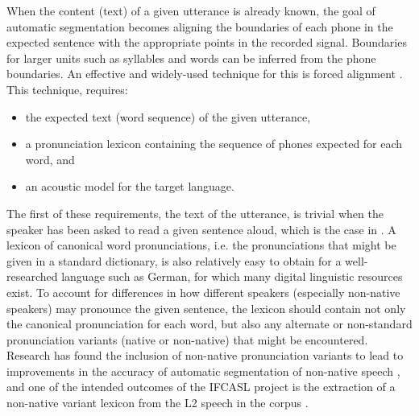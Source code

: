 	
	When the content (text) of a given utterance is already known, the goal of automatic segmentation becomes aligning the  boundaries of each phone in the expected sentence with the appropriate points in the recorded signal. Boundaries for larger units such as syllables and words can be inferred from the phone boundaries. 
	An effective and widely-used technique for this is 
	forced
	alignment \citep{Fohr1996,Mesbahi2011,Fohr2012,Fauth2014}.
	This technique,
	requires:
	\begin{itemize}
	\item the expected text (word sequence) of the given utterance, 
	\item a pronunciation lexicon containing the sequence of phones expected for each word, and
	\item an acoustic model for the target language.
	\end{itemize}
	
	The first of these requirements, the text of the utterance, is trivial when the speaker has been asked to read a given sentence aloud, which is the case in .
	A lexicon of canonical word pronunciations, i.e. the pronunciations that might be given in a standard dictionary, is also relatively easy to obtain for a well-researched language such as German, for which many digital linguistic resources exist.
	 To account for differences in how different speakers (especially non-native speakers) may pronounce the given sentence, 
	the lexicon should contain not only the canonical pronunciation for each word, but also any alternate or non-standard pronunciation variants (native or non-native) that might be encountered. Research  has found the inclusion of non-native pronunciation variants to lead to improvements in the accuracy of automatic segmentation of non-native speech \citep{Jouvet2011,Mesbahi2011,Bonneau2012,Orosanu2012}, and one of the intended outcomes of the IFCASL project is the extraction of a non-native variant lexicon from the L2 speech in the corpus .
	
